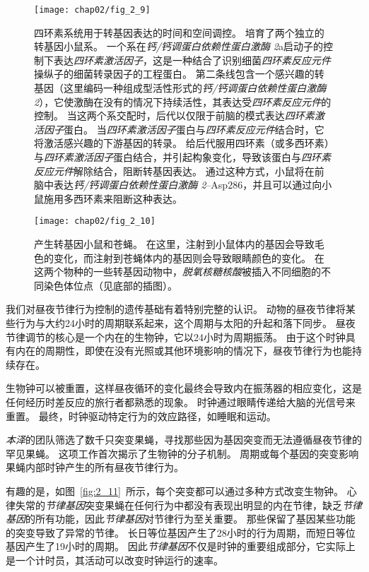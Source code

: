 \begin{figure}[htbp]
	\centering
	\texttt{[image: chap02/fig\_2\_9]}
	\caption{四环素系统用于转基因表达的时间和空间调控。
		培育了两个独立的转基因小鼠系。
		一个系在\textit{钙/钙调蛋白依赖性蛋白激酶 2}a启动子的控制下表达\textit{四环素激活因子}，这是一种结合了识别细菌\textit{四环素反应元件}操纵子的细菌转录因子的工程蛋白。
		第二条线包含一个感兴趣的转基因（这里编码一种组成型活性形式的\textit{钙/钙调蛋白依赖性蛋白激酶 2}），它使激酶在没有的情况下持续活性，其表达受\textit{四环素反应元件}的控制。
		当这两个系交配时，后代以仅限于前脑的模式表达\textit{四环素激活因子}蛋白。
		当\textit{四环素激活因子}蛋白与\textit{四环素反应元件}结合时，它将激活感兴趣的下游基因的转录。
		给后代服用四环素（或多西环素）与\textit{四环素激活因子}蛋白结合，并引起构象变化，导致该蛋白与\textit{四环素反应元件}解除结合，阻断转基因表达。
		通过这种方式，小鼠将在前脑中表达\textit{钙/钙调蛋白依赖性蛋白激酶 2}–Asp286，并且可以通过向小鼠施用多西环素来阻断这种表达\cite{mayford1996control}。}
	\label{fig:2_9}
\end{figure}


\begin{figure}[htbp]
	\centering
	\texttt{[image: chap02/fig\_2\_10]}
	\caption{产生转基因小鼠和苍蝇。
		在这里，注射到小鼠体内的基因会导致毛色的变化，而注射到苍蝇体内的基因则会导致眼睛颜色的变化。
		在这两个物种的一些转基因动物中，\textit{脱氧核糖核酸}被插入不同细胞的不同染色体位点（见底部的插图）\cite{alberts2017molecular}。}
	\label{fig:2_10}
\end{figure}




我们对昼夜节律行为控制的遗传基础有着特别完整的认识。
动物的昼夜节律将某些行为与大约24小时的周期联系起来，这个周期与太阳的升起和落下同步。
昼夜节律调节的核心是一个内在的生物钟，它以24小时为周期振荡。
由于这个时钟具有内在的周期性，即使在没有光照或其他环境影响的情况下，昼夜节律行为也能持续存在。



生物钟可以被重置，这样昼夜循环的变化最终会导致内在振荡器的相应变化，这是任何经历时差反应的旅行者都熟悉的现象。
时钟通过眼睛传递给大脑的光信号来重置。
最终，时钟驱动特定行为的效应路径，如睡眠和运动。


\textit{本泽}的团队筛选了数千只突变果蝇，寻找那些因为基因突变而无法遵循昼夜节律的罕见果蝇。
这项工作首次揭示了生物钟的分子机制。
周期或每个基因的突变影响果蝇内部时钟产生的所有昼夜节律行为。


有趣的是，如图~\ref{fig:2_11}~所示，每个突变都可以通过多种方式改变生物钟。
心律失常的\textit{节律基因}突变果蝇在任何行为中都没有表现出明显的内在节律，缺乏\textit{节律基因}的所有功能，因此\textit{节律基因}对节律行为至关重要。
那些保留了基因某些功能的突变导致了异常的节律。
长日等位基因产生了28小时的行为周期，而短日等位基因产生了19小时的周期。
因此\textit{节律基因}不仅是时钟的重要组成部分，它实际上是一个计时员，其活动可以改变时钟运行的速率。


